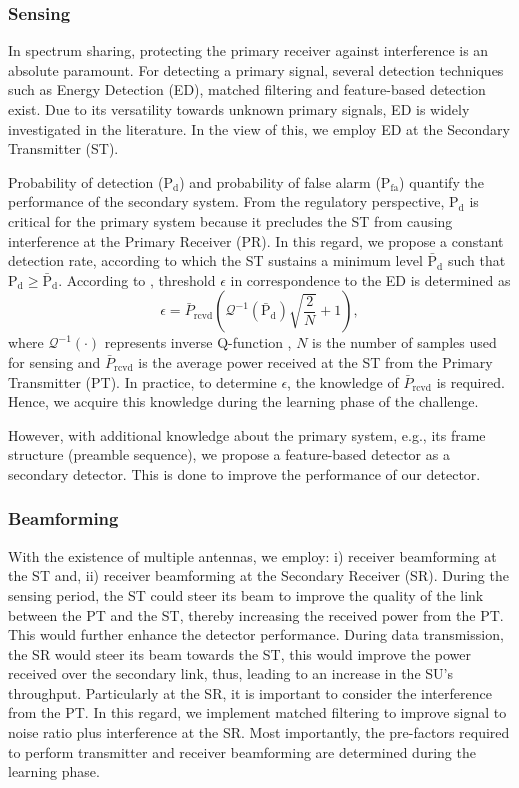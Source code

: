 \documentclass[conference, twocolumn]{IEEEtran}
\newcommand{\sub}[1]{_{\text{#1}}}
\newcommand{\pd}{\text{P}\sub{d}}
\newcommand{\pfa}{\text{P}\sub{fa}}
\newcommand{\pdd}{\bar{\text{P}}\sub{d}}
\newcommand{\bprcvd}{\bar{P}\sub{rcvd}}
\begin{document}
\subsubsection{Sensing}
In spectrum sharing, protecting the primary receiver against interference is an absolute paramount. For detecting a primary signal, several detection techniques such as Energy Detection (ED), matched filtering and feature-based detection exist. Due to its versatility towards unknown primary signals, ED is widely investigated in the literature. In the view of this, we employ ED at the Secondary Transmitter (ST). 


Probability of detection ($\pd$) and probability of false alarm ($\pfa$) quantify the performance of the secondary system. From the regulatory perspective, $\pd$ is critical for the primary system because it precludes the ST from causing interference at the Primary Receiver (PR). In this regard, we propose a constant detection rate, according to which the ST sustains a minimum level $\pdd$ such that $\pd \ge \pdd$. According to \cite{Tan08}, threshold $\epsilon$ in correspondence to the ED is determined as 
\begin{equation} 
\epsilon = \bprcvd \left(\mathcal{Q}^{-1} (\pdd) \sqrt{\frac{2}{N}} + 1 \right), 
\end{equation} 
where $\mathcal{Q}^{-1}(\cdot)$ represents inverse Q-function \cite{grad}, $N$ is the number of samples used for sensing and $\bprcvd$ is the average power received at the ST from the Primary Transmitter (PT). In practice, to determine $\epsilon$, the knowledge of $\bprcvd$ is required. Hence, we acquire this knowledge during the learning phase of the challenge. 

However, with additional knowledge about the primary system, e.g., its frame structure (preamble sequence), we propose a feature-based detector as a secondary detector. This is done to improve the performance of our detector. 

\subsubsection{Beamforming}
With the existence of multiple antennas, we employ: i) receiver beamforming at the ST and, ii) receiver beamforming at the Secondary Receiver (SR). During the sensing period, the ST could steer its beam to improve the quality of the link between the PT and the ST, thereby increasing the received power from the PT. This would further enhance the detector performance. During data transmission, the SR would steer its beam towards the ST, this would improve the power received over the secondary link, thus, leading to an increase in the SU's throughput. Particularly at the SR, it is important to consider the interference from the PT. In this regard, we implement matched filtering to improve signal to noise ratio plus interference at the SR. Most importantly, the pre-factors required to perform transmitter and receiver beamforming are determined during the learning phase. %
\end{document}
